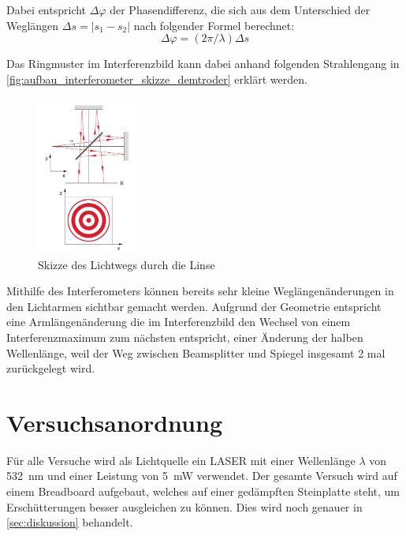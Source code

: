 \documentclass[12pt,english,ngerman]{scrartcl}
\begin{document}
Dabei entspricht $\Delta \varphi$ der Phasendifferenz, die sich aus dem
Unterschied der Weglängen $\Delta s=\left|s_1-s_2\right|$ nach folgender Formel
berechnet:
\begin{equation}
	\Delta \varphi=(2 \pi / \lambda) \Delta s
\end{equation}

Das Ringmuster im Interferenzbild kann dabei anhand folgenden Strahlengang in
\autoref{fig:aufbau_interferometer_skizze_demtroder} erklärt
werden.\cite{krennInterferenzUndPolarisation2023}

\begin{figure}[H]
	\begin{center}
		\includegraphics[width =0.3\textwidth]{./figures/linse_demtroder.jpg}
	\end{center}
	\caption[Skizze des Lichtwegs durch die Linse] {Skizze des Lichtwegs durch die Linse
		\cite{demtroderExperimentalphysik2014}
	}\label{fig:aufbau_interferometer_skizze_demtroder}
\end{figure}

Mithilfe des Interferometers können bereits sehr kleine Weglängenänderungen in
den Lichtarmen sichtbar gemacht werden. Aufgrund der Geometrie entspricht eine
Armlängenänderung die im Interferenzbild den Wechsel von einem
Interferenzmaximum zum nächsten entspricht, einer Änderung der halben
Wellenlänge, weil der Weg zwischen Beamsplitter und Spiegel insgesamt 2 mal
zurückgelegt wird.

\section{Versuchsanordnung}\label{sec:versuchsanordnung}

Für alle Versuche wird als Lichtquelle ein LASER mit einer Wellenlänge
$\lambda$ von \SI{532}{\nano\meter} und einer Leistung von \SI{5}{\milli\watt}
verwendet. Der gesamte Versuch wird auf einem Breadboard aufgebaut, welches auf
einer gedämpften Steinplatte steht, um Erschütterungen besser ausgleichen zu
können. Dies wird noch genauer in \autoref{sec:diskussion} behandelt.
\end{document}
